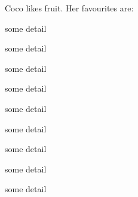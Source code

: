 \documentclass[twocolumn]{article}
\begin{document}
             \blindtext Coco likes fruit. Her favourites are:
        \begin{description}[align=left]
                        \item [Kate] some detail
                        \item [Christina]some detail
                        \item [Laura]some detail
        \end{description}
                    \begin{description}[align=right]
                           \item [Kate] some detail
                           \item [Christina]some detail
                           \item [Laura]some detail
                    \end{description}
        \begin{description}[align=right,labelwidth=3cm]
                      \item [Kate] some detail
                      \item [Christina]some detail
                      \item [Laura]some detail
        \end{description}
       \blindtext
\end{document}
